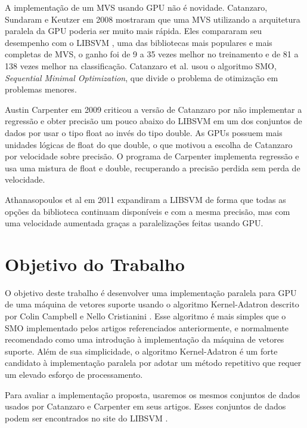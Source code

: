 \par
A implementação de um MVS usando GPU não é novidade. Catanzaro, Sundaram e Keutzer em 2008 \cite{art:REF_ART_1} mostraram que uma MVS utilizando a arquitetura paralela da GPU poderia ser muito mais rápida. Eles compararam seu desempenho com o LIBSVM \cite{art:LIBSVM}, uma das bibliotecas mais populares e mais completas de MVS, o ganho foi de 9 a 35 vezes melhor no treinamento e de 81 a 138 vezes melhor na classificação. Catanzaro et al. usou o algoritmo SMO, \emph{Sequential Minimal Optimization}, que divide o problema de otimização em problemas menores.
\par
Austin Carpenter em 2009 \cite{art:REF_ART_2} criticou a versão de Catanzaro por não implementar a regressão e obter precisão um pouco abaixo do LIBSVM em um dos conjuntos de dados por usar o tipo float ao invés do tipo double. As GPUs possuem mais unidades lógicas de float do que double, o que motivou a escolha de Catanzaro por velocidade sobre precisão. O programa de Carpenter implementa regressão e usa uma mistura de float e double, recuperando a precisão perdida sem perda de velocidade.
\par
Athanasopoulos et al em 2011\cite{art:REF_ART_3} expandiram a LIBSVM de forma que todas as opções da biblioteca continuam disponíveis e com a mesma precisão, mas com uma velocidade aumentada graças a paralelizações feitas usando GPU.\par


\section{Objetivo do Trabalho}\label{sec:LABEL_CHP_1_SEC_B}
O objetivo deste trabalho é desenvolver uma implementação paralela para GPU de uma máquina de vetores suporte usando o algoritmo Kernel-Adatron descrito por Colin Campbell e Nello Cristianini \cite{art:LIVRO_KAA}. Esse algoritmo é mais simples que o SMO implementado pelos artigos referenciados anteriormente, e normalmente  recomendado como uma introdução à implementação da máquina de vetores suporte.
Além de sua simplicidade, o algoritmo Kernel-Adatron é um forte candidato à implementação paralela por adotar um método repetitivo que requer um elevado esforço de processamento. %
\par
Para avaliar a implementação proposta, usaremos os mesmos conjuntos de dados usados por Catanzaro e Carpenter em seus artigos. Esses conjuntos de dados podem ser encontrados no site do LIBSVM \cite{art:LIBSVM}. 

